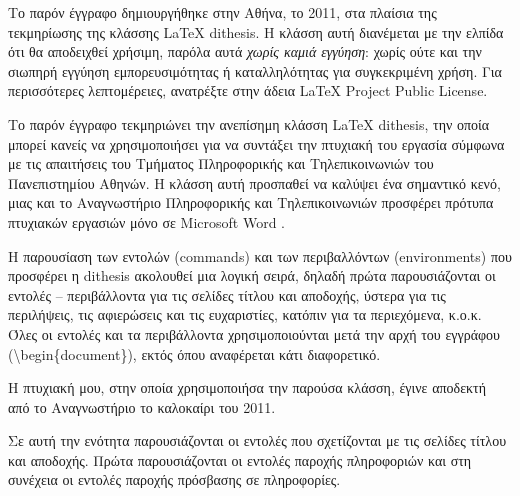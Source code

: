 \documentclass{dithesis}
\begin{document}
\tableofcontents
\listoffigures
\listoftables

\begin{thesisprologue}[Πρόλογος]
  Το παρόν έγγραφο δημιουργήθηκε στην Αθήνα, το 2011, στα πλαίσια της 
  τεκμηρίωσης της κλάσσης \LaTeX{} dithesis.
  Η κλάσση αυτή διανέμεται με την ελπίδα ότι θα αποδειχθεί χρήσιμη, παρόλα αυτά 
  \emph{χωρίς καμιά εγγύηση}: χωρίς ούτε και την σιωπηρή εγγύηση 
  εμπορευσιμότητας ή καταλληλότητας για συγκεκριμένη χρήση.
  Για περισσότερες λεπτομέρειες, ανατρέξτε στην άδεια LaTeX Project Public 
  License.
\end{thesisprologue}

Το παρόν έγγραφο τεκμηριώνει την ανεπίσημη κλάσση \LaTeX{} dithesis, την οποία
μπορεί κανείς να χρησιμοποιήσει για να συντάξει την πτυχιακή του εργασία
σύμφωνα με τις απαιτήσεις του Τμήματος Πληροφορικής και Τηλεπικοινωνιών του
Πανεπιστημίου Αθηνών.
Η κλάσση αυτή προσπαθεί να καλύψει ένα σημαντικό κενό, μιας και το Αναγνωστήριο
Πληροφορικής και Τηλεπικοινωνιών προσφέρει πρότυπα πτυχιακών εργασιών μόνο σε 
Microsoft Word \cite{Anagnostirio}.

Η παρουσίαση των εντολών (commands) και των περιβαλλόντων (environments) που 
προσφέρει η dithesis ακολουθεί μια λογική σειρά, δηλαδή πρώτα παρουσιάζονται οι
 εντολές -- περιβάλλοντα για τις σελίδες τίτλου και αποδοχής, ύστερα για τις 
περιλήψεις, τις αφιερώσεις και τις ευχαριστίες, κατόπιν για τα περιεχόμενα, 
κ.ο.κ.
Όλες οι εντολές και τα περιβάλλοντα χρησιμοποιούνται μετά την αρχή του
εγγράφου (\textbackslash{begin}\{document\}), εκτός όπου αναφέρεται κάτι
διαφορετικό.

H πτυχιακή μου, στην οποία χρησιμοποιήσα την παρούσα κλάσση, έγινε αποδεκτή 
από το Αναγνωστήριο το καλοκαίρι του 2011.

Σε αυτή την ενότητα παρουσιάζονται οι εντολές που σχετίζονται με τις σελίδες 
τίτλου και αποδοχής.
Πρώτα παρουσιάζονται οι εντολές παροχής πληροφοριών και στη συνέχεια οι εντολές
παροχής πρόσβασης σε πληροφορίες.
\end{document}
